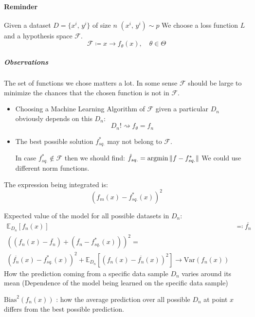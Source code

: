 \paragraph{Reminder}

Given a dataset \(D = \{x^i,\, y^i\}\) of size \(n\) \((x^i,\, y^i)\sim p\) We
choose a loss function \(L\) and a hypothesis space \(\mathcal F\).
\[\mathcal F \coloneqq { x \rightarrow f_\theta(x),\quad \theta \in \Theta }
\]

\subparagraph{Observations}

The set of functions we chose matters a lot. In some sense \(\mathcal F\) should
be large to minimize the chances that the chosen function is not in
\(\mathcal F\).

\begin{itemize}
	\item
	      Choosing a Machine Learning Algorithm of \(\mathcal F\) given a particular
	      \(D_n\) obviously depends on this \(D_n\):
	      \[D_n! \rightsquigarrow f_\theta = f_n\]
	\item The best possible solution \(f^*_{sq.}\) may not belong to \(\mathcal F\).

	      In case \(f^*_{sq.} \notin \mathcal F\) then we should find:
	      \(\hat{f}_{sq.} = \operatorname{argmin} {\lVert f - f^*_{sq.} \rVert}\)
	      We could use different norm functions.
\end{itemize}

The expression being integrated is:
\[\left( f_m(x) - f^*_{sq.}(x) \right)^2
\]

Expected value of the model for all possible datasets in \(D_n\):
\begin{align*}
	\mathds{E}_{D_n} \left[ f_n(x) \right] & \eqqcolon \overline{f_n}                                        \\
	\left( \left( f_n(x) - \overline{f_n} \right) + \left( \overline{f_n} - f_{sq.}^*(x) \right) \right)^2 = \\
	\left( \overline{f_n}(x) - f_{sq.}^*(x) \right)^2 +
	\mathds{E}_{D_n} \left[ \left( f_n(x) - \overline{f_n}(x) \right)^2 \right]
	\rightarrow \text{Var}(f_n(x))
\end{align*}
How the prediction coming from a specific data sample $D_n$ varies around its mean
(Dependence of the model being learned on the specific data sample)

\(\text{Bias}^2(f_n(x))\) : how the average prediction over all possible
\(D_n\) at point \(x\) differs from the best possible prediction.

